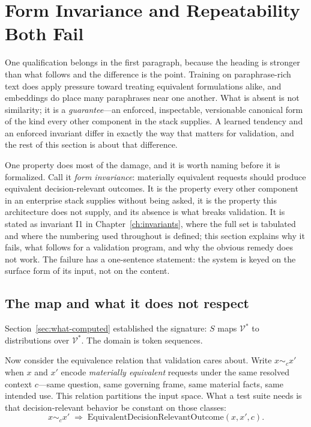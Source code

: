 \chapter{Form Invariance and Repeatability Both Fail}
\label{ch:canonical-form}
\label{sec:canonical-form}

One qualification belongs in the first paragraph, because the heading is stronger than
what follows and the difference is the point. Training on paraphrase-rich text does
apply pressure toward treating equivalent formulations alike, and embeddings do place
many paraphrases near one another. What is absent is not similarity; it is a
\emph{guarantee}---an enforced, inspectable, versionable canonical form of the kind
every other component in the stack supplies. A learned tendency and an enforced
invariant differ in exactly the way that matters for validation, and the rest of this
section is about that difference.

One property does most of the damage, and it is worth naming before it is formalized.
Call it \emph{form invariance}: materially equivalent requests should produce equivalent
decision-relevant outcomes. It is the property every other component in an enterprise
stack supplies without being asked, it is the property this architecture does not supply,
and its absence is what breaks validation. It is stated as
invariant I1 in Chapter~\ref{ch:invariants}, where the full set is tabulated and
where the numbering used throughout is defined; this section explains why it fails, what follows for a
validation program, and why the obvious remedy does not work. The failure has a
one-sentence statement: the system is keyed on the surface form of its input, not on the
content.

\section{The map and what it does not respect}

Section~\ref{sec:what-computed} established the signature: $S$ maps
$\mathcal{V}^{*}$ to distributions over $\mathcal{V}^{*}$. The domain is token
sequences.

Now consider the equivalence relation that validation cares about. Write
$x \sim_c x'$ when $x$ and $x'$ encode \emph{materially equivalent} requests under
the same resolved context $c$---same question, same governing frame, same material
facts, same intended use. This relation partitions the input space. What a test
suite needs is that decision-relevant behavior be constant on those classes:
\begin{equation}
  x \sim_c x' \;\Longrightarrow\; \text{EquivalentDecisionRelevantOutcome}(x, x', c).
  \label{eq:form-invariance}
\end{equation}


